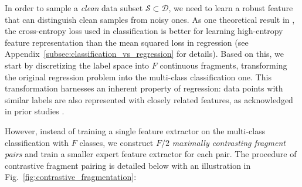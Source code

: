 \documentclass{article}
\theoremstyle{plain}
\theoremstyle{definition}
\theoremstyle{remark}
\begin{document}
In order to sample a \textit{clean} data subset $\mathcal{S} \subset \mathcal{D}$, 
we need to learn a robust feature that can distinguish clean samples from noisy ones.
As one theoretical result in \citep{zhang2023}, the cross-entropy loss used in classification is better for learning high-entropy feature representation than the mean squared loss in regression (see Appendix~\ref{subsec:classification_vs_regression} for details). 
Based on this, we start by discretizing the label space into $F$ continuous fragments, transforming the original regression problem into the multi-class classification one.
This transformation harnesses an inherent property of regression: data points with similar labels are also represented with closely related features, as acknowledged in prior studies \citep{gong22rank,yang21ldsfds,yao22cmixup}.

However, instead of training a single feature extractor on the multi-class classification with $F$ classes, we construct $F/2$ \textit{maximally contrasting fragment pairs} and train a smaller expert feature extractor for each pair.
The procedure of contrastive fragment pairing is detailed below with an illustration in Fig.~\ref{fig:contrastive_fragmentation}:
\end{document}

